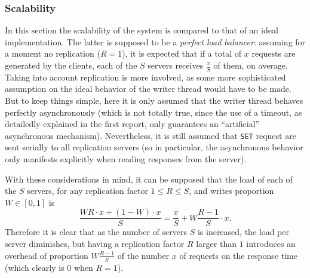 \documentclass[11pt]{article}
\theoremstyle{definition}
\renewcommand\t\texttt
\begin{document}
\subsubsection{Scalability}

In this section the scalability of the system is compared to that of an ideal implementation.
The latter is supposed to be a \emph{perfect load balancer}: assuming for a moment no replication ($R=1$), it is expected that if a total of $x$ requests are generated by the clients, each of the $S$ servers receives $\frac xS$ of them, on average.
Taking into account replication is more involved, as some more sophisticated assumption on the ideal behavior of the writer thread would have to be made.
But to keep things simple, here it is only assumed that the writer thread behaves perfectly asynchronously (which is not totally true, since the use of a timeout, as detailedly explained in the first report, only guarantees an ``artificial'' asynchronous mechanism).
Nevertheless, it is still assumed that \t{SET} request are sent serially to all replication servers (so in particular, the asynchronous behavior only manifests explicitly when reading responses from the server).

With these considerations in mind, it can be supposed that the load of each of the $S$ servers, for any replication factor $1\leq R\leq S$, and writes proportion $W\in[0,1]$ is
\begin{equation}
    \label{eqn:load}
    \frac{WR\cdot x+(1-W)\cdot x}S=\frac xS+W\frac{R-1}S\cdot x.
\end{equation}
Therefore it is clear that as the number of servers $S$ is increased, the load per server diminishes, but having a replication factor $R$ larger than $1$ introduces an overhead of proportion $W\frac{R-1}S$ of the number $x$ of requests on the response time (which clearly is $0$ when $R=1$).
\end{document}
